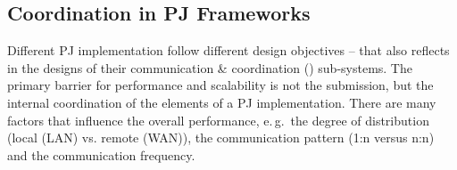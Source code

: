 \documentclass[conference]{IEEEtran}
\begin{document}
\subsection{Coordination in PJ Frameworks}
\label{sec:pj_performance}


Different PJ implementation follow different design objectives -- that
also reflects in the designs of their communication \& coordination
(\cc) sub-systems.  The primary barrier for performance and
scalability is not the \cu  submission, but the internal coordination
of the elements of a PJ implementation. There are many factors that
influence the overall performance, e.\,g.\ the degree of distribution
(local (LAN) vs. remote (WAN)), the communication pattern (1:n versus
n:n) and the communication frequency. %



\end{document}
